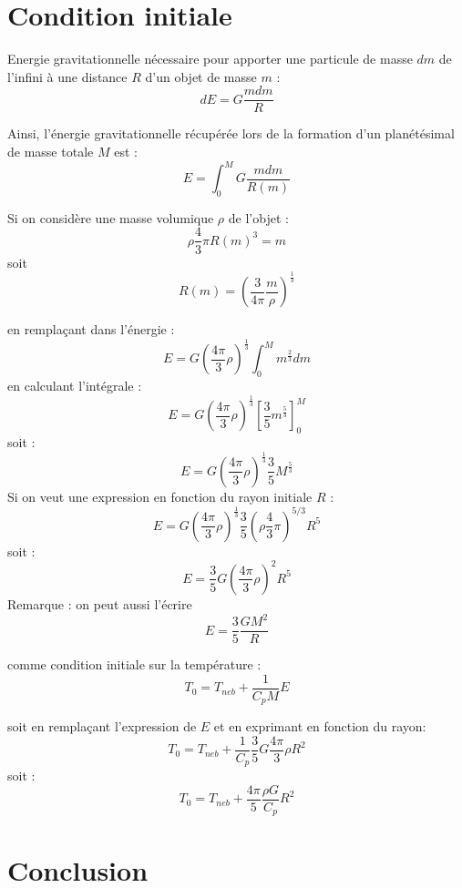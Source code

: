 \documentclass[10pt,a4paper]{article}
\numberwithin{equation}{section}
\begin{document}
\section{Condition initiale}

Energie gravitationnelle nécessaire pour apporter une particule de masse $dm$ de l'infini à une distance $R$ d'un objet de masse $m$ :
$$ dE = G \frac{m dm}{R}$$ 

Ainsi, l'énergie gravitationnelle récupérée lors de la formation d'un planétésimal de masse totale $M$ est :
$$ E = \int_0^M G \frac{m dm}{R(m)}$$

Si on considère une masse volumique $\rho$ de l'objet :
$$\rho\frac{4}{3}\pi R(m)^3=m$$
soit 
$$R(m)=\left(\frac{3}{4\pi}\frac{m}{\rho}\right)^{\frac{1}{3}}$$

en remplaçant dans l'énergie :
$$E=G\left(\frac{4\pi}{3}\rho\right)^\frac{1}{3}\int_0^M m^\frac{2}{3}dm$$
en calculant l'intégrale :
$$E=G\left(\frac{4\pi}{3}\rho\right)^\frac{1}{3}\left[\frac{3}{5} m^\frac{5}{3}\right]_0^M$$
soit :
$$E=G\left(\frac{4\pi}{3}\rho\right)^\frac{1}{3}\frac{3}{5} M^\frac{5}{3}$$
Si on veut une expression en fonction du rayon initiale $R$ :
$$E=G\left(\frac{4\pi}{3}\rho\right)^\frac{1}{3}\frac{3}{5} \left(\rho\frac{4}{3}\pi\right)^{5/3}R^5$$
soit :
$$E=\frac{3}{5}G\left(\frac{4\pi}{3}\rho\right)^2 R^5$$
Remarque : on peut aussi l'écrire
$$ E = \frac{3}{5} \frac{GM^2}{R}$$

comme condition initiale sur la température :
$$T_0=T_{neb} + \frac{1}{C_p M} E$$

soit en remplaçant l'expression de $E$ et en exprimant en fonction du rayon:
$$T_0 = T_{neb} + \frac{1}{C_p} \frac{3}{5}G\frac{4\pi}{3}\rho R^2$$
soit :
$$T_0 = T_{neb} + \frac{4\pi}{5}\frac{\rho G}{C_p} R^2$$




\section*{Conclusion}






\newpage
\appendix
\end{document}
